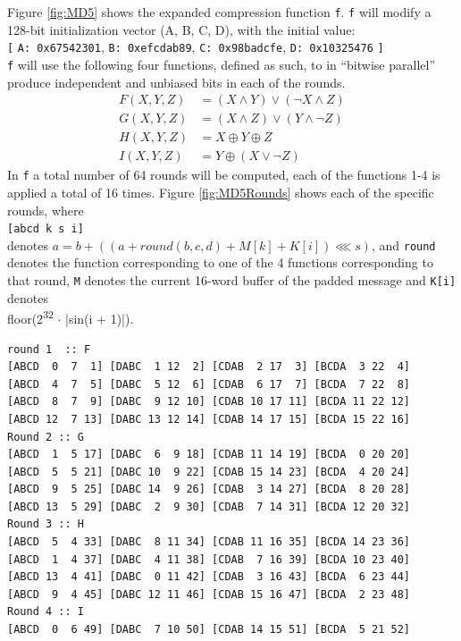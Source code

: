\documentclass[a4paper, openany]{book}
\begin{document}
\begin{abstact}
Figure \ref{fig:MD5} shows the expanded compression function \texttt{f}. \texttt{f} will modify a 128-bit initialization vector (A, B, C, D), with the initial value:\\
\texttt{[} \texttt{A: 0x67542301}, \texttt{B: 0xefcdab89}, \texttt{C: 0x98badcfe}, \texttt{D: 0x10325476} \texttt{]}\\
\texttt{f} will use the following four functions, defined as such, to in ``bitwise parallel'' produce independent and unbiased bits in each of the rounds.
\begin{align}
F(X, Y, Z) &= (X \wedge Y) \vee (\neg X \wedge Z) \\
G(X, Y, Z) &= (X \wedge Z) \vee (Y \wedge \neg Z) \\
H(X, Y, Z) &= X \oplus Y \oplus Z \\
I(X, Y, Z) &= Y \oplus ( X \vee \neg Z)
\end{align}
In \texttt{f} a total number of 64 rounds will be computed, each of the functions 1-4 is applied a total of 16 times. Figure \ref{fig:MD5Rounds} shows each of the specific rounds, where\\
\texttt{[abcd k s i]}\\
denotes \(a = b + (( a + round(b,c,d) + M[k] + K[i]) \lll s)\), and \texttt{round} denotes the function corresponding to one of the 4 functions corresponding to that round, \texttt{M} denotes the current 16-word buffer of the padded message and \texttt{K[i]} denotes\\
floor(2\textsuperscript{32} \(\cdot\) |sin(i + 1)|).
\begin{table}[H]
\centering
\begin{BVerbatim}[fontsize=\tiny]
round 1  :: F
[ABCD  0  7  1] [DABC  1 12  2] [CDAB  2 17  3] [BCDA  3 22  4]
[ABCD  4  7  5] [DABC  5 12  6] [CDAB  6 17  7] [BCDA  7 22  8]
[ABCD  8  7  9] [DABC  9 12 10] [CDAB 10 17 11] [BCDA 11 22 12]
[ABCD 12  7 13] [DABC 13 12 14] [CDAB 14 17 15] [BCDA 15 22 16]
Round 2 :: G
[ABCD  1  5 17] [DABC  6  9 18] [CDAB 11 14 19] [BCDA  0 20 20]
[ABCD  5  5 21] [DABC 10  9 22] [CDAB 15 14 23] [BCDA  4 20 24]
[ABCD  9  5 25] [DABC 14  9 26] [CDAB  3 14 27] [BCDA  8 20 28]
[ABCD 13  5 29] [DABC  2  9 30] [CDAB  7 14 31] [BCDA 12 20 32]
Round 3 :: H
[ABCD  5  4 33] [DABC  8 11 34] [CDAB 11 16 35] [BCDA 14 23 36]
[ABCD  1  4 37] [DABC  4 11 38] [CDAB  7 16 39] [BCDA 10 23 40]
[ABCD 13  4 41] [DABC  0 11 42] [CDAB  3 16 43] [BCDA  6 23 44]
[ABCD  9  4 45] [DABC 12 11 46] [CDAB 15 16 47] [BCDA  2 23 48]
Round 4 :: I
[ABCD  0  6 49] [DABC  7 10 50] [CDAB 14 15 51] [BCDA  5 21 52]

\end{BVerbatim}
\end{table}
\end{abstact}
\end{document}
